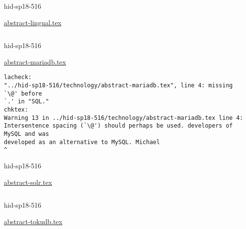 

\begin{IU}

hid-sp18-516

\href{https://github.com/cloudmesh-community/hid-sp18-516/blob/master//technology/abstract-lingual.tex}{abstract-lingual.tex}

\begin{tiny}
\begin{verbatim}
\end{verbatim}
\end{tiny}
\end{IU}



\begin{IU}

hid-sp18-516

\href{https://github.com/cloudmesh-community/hid-sp18-516/blob/master//technology/abstract-mariadb.tex}{abstract-mariadb.tex}

\begin{tiny}
\begin{verbatim}
lacheck:
"../hid-sp18-516/technology/abstract-mariadb.tex", line 4: missing `\@' before
`.' in "SQL."
chktex:
Warning 13 in ../hid-sp18-516/technology/abstract-mariadb.tex line 4:
Intersentence spacing (`\@') should perhaps be used. developers of MySQL and was
developed as an alternative to MySQL. Michael
^
\end{verbatim}
\end{tiny}
\end{IU}



\begin{IU}

hid-sp18-516

\href{https://github.com/cloudmesh-community/hid-sp18-516/blob/master//technology/abstract-solr.tex}{abstract-solr.tex}

\begin{tiny}
\begin{verbatim}
\end{verbatim}
\end{tiny}
\end{IU}



\begin{IU}

hid-sp18-516

\href{https://github.com/cloudmesh-community/hid-sp18-516/blob/master//technology/abstract-tokudb.tex}{abstract-tokudb.tex}

\begin{tiny}
\begin{verbatim}
\end{verbatim}
\end{tiny}
\end{IU}

